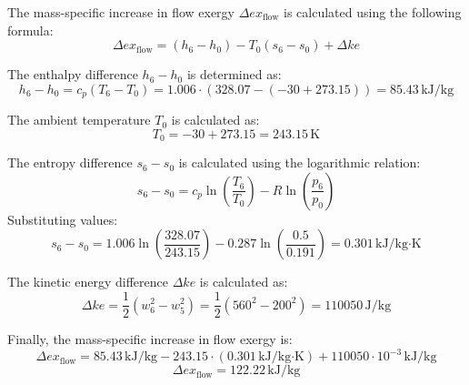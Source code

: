 The mass-specific increase in flow exergy \( \Delta ex_{\text{flow}} \) is calculated using the following formula:  
\[
\Delta ex_{\text{flow}} = (h_6 - h_0) - T_0 (s_6 - s_0) + \Delta ke
\]  

The enthalpy difference \( h_6 - h_0 \) is determined as:  
\[
h_6 - h_0 = c_p (T_6 - T_0) = 1.006 \cdot (328.07 - (-30 + 273.15)) = 85.43 \, \text{kJ/kg}
\]  

The ambient temperature \( T_0 \) is calculated as:  
\[
T_0 = -30 + 273.15 = 243.15 \, \text{K}
\]  

The entropy difference \( s_6 - s_0 \) is calculated using the logarithmic relation:  
\[
s_6 - s_0 = c_p \ln \left( \frac{T_6}{T_0} \right) - R \ln \left( \frac{p_6}{p_0} \right)
\]  
Substituting values:  
\[
s_6 - s_0 = 1.006 \ln \left( \frac{328.07}{243.15} \right) - 0.287 \ln \left( \frac{0.5}{0.191} \right) = 0.301 \, \text{kJ/kg·K}
\]  

The kinetic energy difference \( \Delta ke \) is calculated as:  
\[
\Delta ke = \frac{1}{2} (w_6^2 - w_5^2) = \frac{1}{2} (560^2 - 200^2) = 110050 \, \text{J/kg}
\]  

Finally, the mass-specific increase in flow exergy is:  
\[
\Delta ex_{\text{flow}} = 85.43 \, \text{kJ/kg} - 243.15 \cdot (0.301 \, \text{kJ/kg·K}) + 110050 \cdot 10^{-3} \, \text{kJ/kg}
\]  
\[
\Delta ex_{\text{flow}} = 122.22 \, \text{kJ/kg}
\]